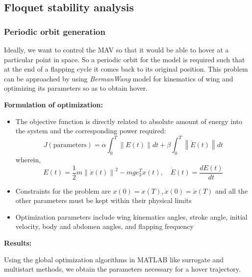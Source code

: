 \documentclass[10pt]{article}
\newcommand{\norm}[1]{\ensuremath{\left\| #1 \right\|}}
\begin{document}
\subsection{Floquet stability analysis}
\subsubsection{Periodic orbit generation}
Ideally, we want to control the MAV so that it would be able to hover at a particular point in space. So a periodic orbit for the model is required such that at the end of a flapping cycle it comes back to its original position. This problem can be approached by using \textit{BermanWang} model for kinematics of wing and optimizing its parameters so as to obtain hover.

\noindent \textbf{Formulation of optimization:}
\begin{itemize}
	\item The objective function is directly related to absolute amount of energy into the system and the corresponding power required:
	\begin{equation}\label{eqn:obj_func}
		J(\text{parameters}) = \alpha \int_{0}^{T} \norm{E(t)} dt + \beta \int_{0}^{T} \norm{\dot{E}(t)} dt
	\end{equation}
	wherein,
	\[ E(t) = \frac{1}{2} m \norm{\dot x(t)}^2 - mge_3^T x(t), \quad \dot{E}(t) = \frac{d E(t)}{d t} \]
	\item Constraints for the problem are $ x(0) = x(T), \dot{x}(0) = \dot{x}(T) $ and all the other parameters must be kept within their physical limits
	\item Optimization parameters include wing kinematics angles, stroke angle, initial velocity, body and abdomen angles, and flapping frequency
\end{itemize}

\noindent \textbf{Results:}

Using the global optimization algorithms in MATLAB like surrogate and multistart methods, we obtain the parameters necessary for a hover trajectory.
\end{document}
